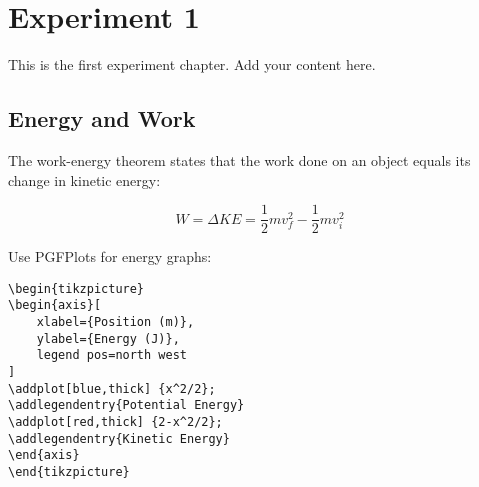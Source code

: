 \chapter{Experiment 1}
This is the first experiment chapter. Add your content here.

\section{Energy and Work}

The work-energy theorem states that the work done on an object equals its change in kinetic energy:

\[ W = \Delta KE = \frac{1}{2}mv_f^2 - \frac{1}{2}mv_i^2 \]

\begin{tutorialbox}[title=Creating Energy Diagrams]
Use PGFPlots for energy graphs:
\begin{verbatim}
\begin{tikzpicture}
\begin{axis}[
    xlabel={Position (m)},
    ylabel={Energy (J)},
    legend pos=north west
]
\addplot[blue,thick] {x^2/2};
\addlegendentry{Potential Energy}
\addplot[red,thick] {2-x^2/2};
\addlegendentry{Kinetic Energy}
\end{axis}
\end{tikzpicture}
\end{verbatim}
\end{tutorialbox}